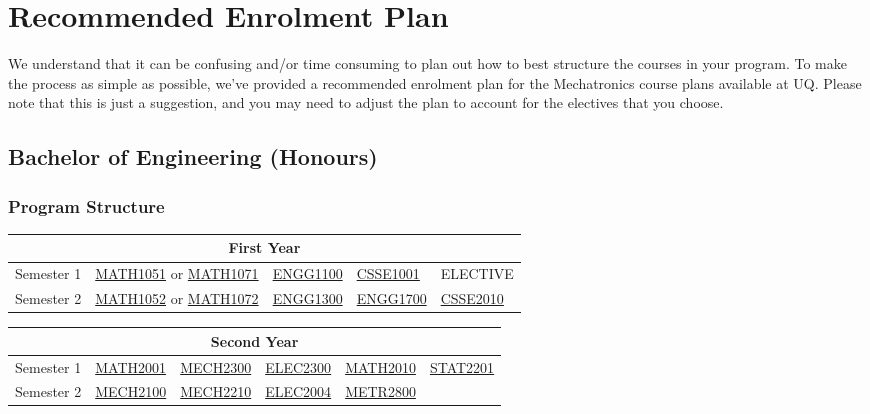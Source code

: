 \chapter{Recommended Enrolment Plan}
We understand that it can be confusing and/or time consuming to plan out how to best structure the courses in your program. To make the process as simple as possible, we've provided a recommended enrolment plan for the Mechatronics course plans available at UQ. Please note that this is just a suggestion, and you may need to adjust the plan to account for the electives that you choose.
\section{Bachelor of Engineering (Honours)}
\subsection{Program Structure}
\renewcommand{\arraystretch}{1.5}
\begin{table}[H]
    \centering
    \begin{tabular}{| m{6em} | m{5em} m{5em} m{5em} m{5em} m{5em} |}
        \hline
        \multicolumn{6}{|c|}{\bfseries First Year} \\
        \hline
        Semester 1 & \multicolumn{2}{c}{\hyperlink{MATH1051}{MATH1051} or \hyperlink{MATH1071}{MATH1071}} & \hyperlink{ENGG1100}{ENGG1100} & \hyperlink{CSSE1001}{CSSE1001} & ELECTIVE \\
        Semester 2 & \multicolumn{2}{c}{\hyperlink{MATH1052}{MATH1052} or \hyperlink{MATH1072}{MATH1072}} & \hyperlink{ENGG1300}{ENGG1300} & \hyperlink{ENGG1700}{ENGG1700} & \hyperlink{CSSE2010}{CSSE2010} \\
        \hline
    \end{tabular}
\end{table}
\begin{table}[H]
    \centering
    \begin{tabular}{| m{6em} | m{5em} m{5em} m{5em} m{5em} m{5em} |}
        \hline
        \multicolumn{6}{|c|}{\bfseries Second Year} \\
        \hline
        Semester 1 & \hyperlink{MATH2001}{MATH2001} & \hyperlink{MECH2300}{MECH2300} & \hyperlink{ELEC2300}{ELEC2300} & \hyperlink{MATH2010}{MATH2010} & \hyperlink{STAT2201}{STAT2201} \\
        Semester 2 & \hyperlink{MECH2100}{MECH2100} & \hyperlink{MECH2210}{MECH2210} & \hyperlink{ELEC2004}{ELEC2004} & \hyperlink{METR2800}{METR2800} & \\
        \hline
    \end{tabular}
\end{table}
